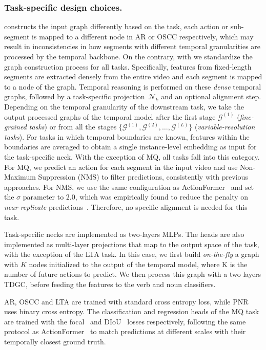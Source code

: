 \subsubsection{Task-specific design choices.}\label{ts-design}
\ourscvpr constructs the input graph differently based on the task, \ie each action or sub-segment is mapped to a different node in AR or OSCC respectively, which may result in inconsistencies in how segments with different temporal granularities are processed by the temporal backbone.
On the contrary, with \ours we standardize the graph construction process for all tasks.
Specifically, features from fixed-length segments are extracted densely from the entire video and each segment is mapped to a node of the graph.
Temporal reasoning is performed on these \textit{dense} temporal graphs, followed by a task-specific projection~$\mathcal{N}_k$ and an optional alignment step.
Depending on the temporal granularity of the downstream task, we take the output processed graphs of the temporal model after the first stage $\mathcal{G}^{(1)}$ (\textit{fine-grained tasks}) or from all the stages $\{\mathcal{G}^{(1)}, \mathcal{G}^{(2)}, \dots, \mathcal{G}^{(L)}\}$ (\textit{variable-resolution tasks}).
%
For tasks in which temporal boundaries are known, features within the boundaries are averaged to obtain a single instance-level embedding as input for the task-specific neck. With the exception of MQ, all tasks fall into this category.
%
For MQ, we predict an action for each segment in the input video and use Non-Maximum Suppression (NMS) to filter predictions, consistently with previous approaches. For NMS, we use the same configuration as ActionFormer~\cite{zhang2022actionformer} and set the $\sigma$ parameter to $2.0$, which was empirically found to reduce the penalty on \textit{near-replicate} predictions~\cite{sui2023nmsthresholdmattersego4d}. Therefore, no specific alignment is needed for this task.

Task-specific necks are implemented as two-layers MLPs. The heads are also implemented as multi-layer projections that map to the output space of the task, with the exception of the LTA task. In this case, we first build \textit{on-the-fly} a graph with $K$ nodes initialized to the output of the temporal model, where K is the number of future actions to predict. We then process this graph with a two layers TDGC, before feeding the features to the verb and noun classifiers.

AR, OSCC and LTA are trained with standard cross entropy loss, while PNR uses binary cross entropy. The classification and regression heads of the MQ task are trained with the focal~\cite{ross2017focal} and DIoU~\cite{zheng2020distance} losses respectively, following the same protocol as ActionFormer~\cite{zhang2022actionformer} to match predictions at different scales with their temporally closest ground truth.

